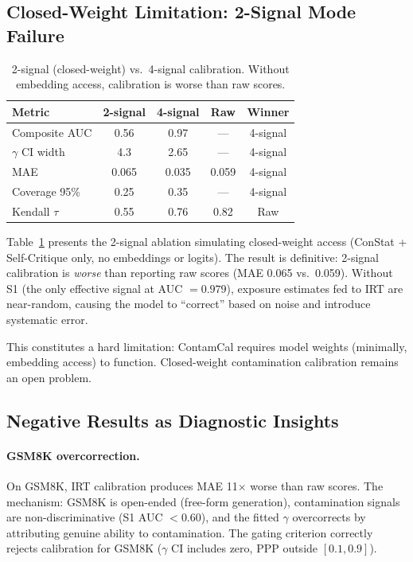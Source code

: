 \documentclass[11pt,a4paper]{article}
\begin{document}
\subsection{Closed-Weight Limitation: 2-Signal Mode Failure}

\begin{table}[t]
\centering
\small
\caption{2-signal (closed-weight) vs.\ 4-signal calibration. Without embedding access, calibration is worse than raw scores.}
\label{tab:closed}
\begin{tabular}{lcccc}
\toprule
Metric & 2-signal & 4-signal & Raw & Winner \\
\midrule
Composite AUC & 0.56 & 0.97 & --- & 4-signal \\
$\gamma$ CI width & 4.3 & 2.65 & --- & 4-signal \\
MAE & 0.065 & 0.035 & 0.059 & 4-signal \\
Coverage 95\% & 0.25 & 0.35 & --- & 4-signal \\
Kendall $\tau$ & 0.55 & 0.76 & 0.82 & Raw \\
\bottomrule
\end{tabular}
\end{table}

Table~\ref{tab:closed} presents the 2-signal ablation simulating closed-weight access (ConStat + Self-Critique only, no embeddings or logits). The result is definitive: 2-signal calibration is \emph{worse} than reporting raw scores (MAE 0.065 vs.\ 0.059). Without S1 (the only effective signal at AUC $= 0.979$), exposure estimates fed to IRT are near-random, causing the model to ``correct'' based on noise and introduce systematic error.

This constitutes a hard limitation: ContamCal requires model weights (minimally, embedding access) to function. Closed-weight contamination calibration remains an open problem.

\subsection{Negative Results as Diagnostic Insights}

\paragraph{GSM8K overcorrection.} On GSM8K, IRT calibration produces MAE 11$\times$ worse than raw scores. The mechanism: GSM8K is open-ended (free-form generation), contamination signals are non-discriminative (S1 AUC $< 0.60$), and the fitted $\gamma$ overcorrects by attributing genuine ability to contamination. The gating criterion correctly rejects calibration for GSM8K ($\gamma$ CI includes zero, PPP outside $[0.1, 0.9]$).
\end{document}
